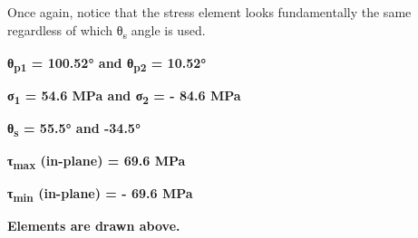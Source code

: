 \documentclass[
  letterpaper,
  DIV=11,
  numbers=noendperiod]{scrreprt}
\theoremstyle{definition}
\theoremstyle{remark}
\begin{document}
\begin{tcolorbox}
\begin{tcolorbox}
Once again, notice that the stress element looks fundamentally the same
regardless of which θ\textsubscript{s} angle is used.

\textbf{θ\textsubscript{p1} = 100.52° and θ\textsubscript{p2} = 10.52°}

\textbf{σ\textsubscript{1} = 54.6 MPa and σ\textsubscript{2} = - 84.6
MPa}

\textbf{θ\textsubscript{s} = 55.5° and -34.5°}

\textbf{τ\textsubscript{max} (in-plane) = 69.6 MPa}

\textbf{τ\textsubscript{min} (in-plane) = - 69.6 MPa}

\textbf{Elements are drawn above.}

\end{tcolorbox}

\end{tcolorbox}
\end{document}
